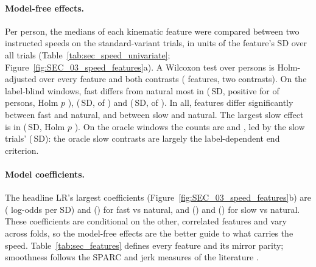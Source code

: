 \paragraph{Model-free effects.} Per person, the medians of each kinematic feature were compared between two
instructed speeds on the standard-variant trials, in units of the feature's SD over all trials
(Table~\ref{tab:sec_speed_univariate}; Figure~\ref{fig:SEC_03_speed_features}a). A Wilcoxon test over persons is
Holm-adjusted over every feature and both contrasts ( features, two contrasts). On the
label-blind windows, fast differs from natural most in 
(\,SD, positive for  of
 persons, Holm $p$ ),
 (\,SD,  of
) and  (\,SD,
 of ). In all, 
features differ significantly between fast and natural, and  between slow and natural. The
largest slow effect is in  (\,SD, Holm $p$
). On the oracle windows the counts are  and
, led by the slow trials' 
(\,SD): the oracle slow contrasts are largely the label-dependent end criterion.

\paragraph{Model coefficients.} The headline LR's largest coefficients (Figure~\ref{fig:SEC_03_speed_features}b)
are  ( log-odds per SD) and 
() for fast vs natural, and  () and
 () for slow vs natural. These coefficients are conditional on
the other, correlated features and vary across folds, so the model-free effects are the better guide to what
carries the speed. Table~\ref{tab:sec_features} defines every feature and its mirror parity; smoothness follows
the SPARC and jerk measures of the literature \cite{melendezcalderon2021smoothness,flash1985coordination}.

